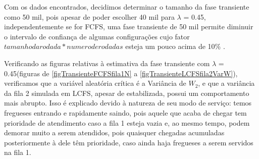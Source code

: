 \documentclass[a4paper,10pt]{article}
\begin{document}
%

    Com os dados encontrados, decidimos determinar o tamanho da fase transiente como 50 mil, pois apesar de poder escolher 40 mil para $\lambda$ = 0.45,
independentemente se for FCFS, uma fase transiente de 50 mil permite diminuir o intervalo de confiança de algumas configurações cujo fator $tamanho da rodada * numero de rodadas$ esteja um pouco acima de 10\% .

    Verificando as figuras relativas à estimativa da fase transiente com $\lambda$ = 0.45(figuras de \ref{figTransienteFCFSfila1N} a \ref{figTransienteLCFSfila2VarW}),
verificamos que a variável aleatória crítica é a Variância de $W_2$, e que a variância da fila 2 simulada em LCFS, apesar de estabilizada, possui um comportamento mais abrupto.
Isso é explicado devido à natureza de seu modo de serviço: temos fregueses entrando e rapidamente saindo, pois aquele que acaba de chegar tem prioridade de atendimento caso a fila 1 esteja vazia e,
ao mesmo tempo, podem demorar muito a serem atendidos, pois quaisquer chegadas acumuladas posteriormente à dele têm prioridade, caso ainda haja fregueses a serem servidos na fila 1.
\end{document}
